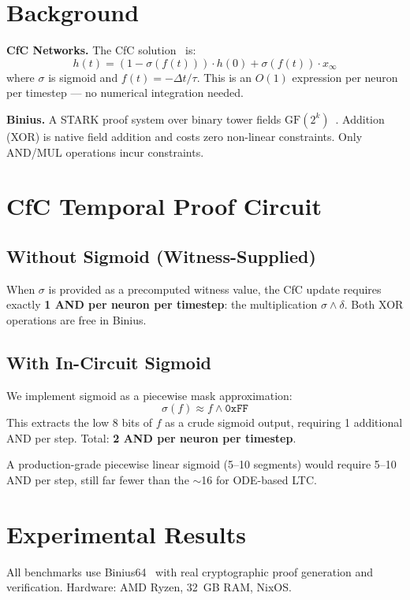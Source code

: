 \documentclass[11pt]{article}
\begin{document}
\section{Background}

\textbf{CfC Networks.} The CfC solution~\cite{hasani2022cfc} is:
$$h(t) = (1 - \sigma(f(t))) \cdot h(0) + \sigma(f(t)) \cdot x_\infty$$
where $\sigma$ is sigmoid and $f(t) = -\Delta t / \tau$. This is an $O(1)$ expression per neuron per timestep --- no numerical integration needed.

\textbf{Binius.} A STARK proof system over binary tower fields $\mathrm{GF}(2^k)$~\cite{diamond2023binius}. Addition (XOR) is native field addition and costs zero non-linear constraints. Only AND/MUL operations incur constraints.

\section{CfC Temporal Proof Circuit}

\subsection{Without Sigmoid (Witness-Supplied)}

When $\sigma$ is provided as a precomputed witness value, the CfC update requires exactly \textbf{1 AND per neuron per timestep}: the multiplication $\sigma \wedge \delta$. Both XOR operations are free in Binius.

\subsection{With In-Circuit Sigmoid}

We implement sigmoid as a piecewise mask approximation:
$$\sigma(f) \approx f \wedge \texttt{0xFF}$$
This extracts the low 8 bits of $f$ as a crude sigmoid output, requiring 1 additional AND per step. Total: \textbf{2 AND per neuron per timestep}.

A production-grade piecewise linear sigmoid (5--10 segments) would require 5--10 AND per step, still far fewer than the $\sim$16 for ODE-based LTC.

\section{Experimental Results}

All benchmarks use Binius64~\cite{binius64} with real cryptographic proof generation and verification. Hardware: AMD Ryzen, 32~GB RAM, NixOS.
\end{document}
